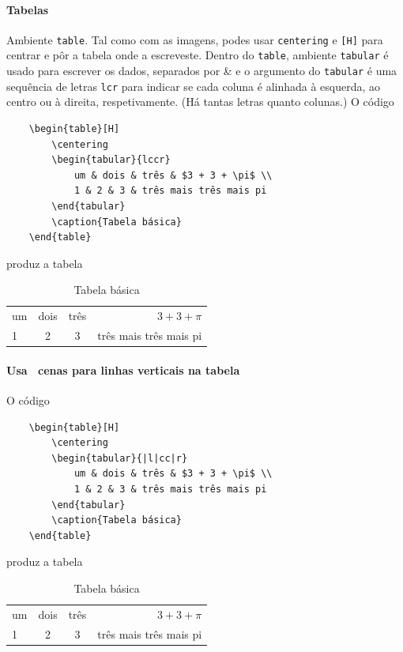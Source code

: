 \documentclass[11pt]{article}
\begin{document}
\paragraph{Tabelas}
Ambiente \texttt{table}.
Tal como com as imagens, podes usar \texttt{centering} e
\texttt{[H]} para centrar e pôr a tabela onde a escreveste.
Dentro do \texttt{table}, ambiente \texttt{tabular} é usado para escrever os
dados, separados por \& e o argumento do \texttt{tabular} é uma sequência de letras
\texttt{lcr} para indicar se cada coluna é alinhada à esquerda, ao centro ou à
direita, respetivamente. (Há tantas letras quanto colunas.)
O código
\begin{verbatim}
    \begin{table}[H]
        \centering
        \begin{tabular}{lccr}
            um & dois & três & $3 + 3 + \pi$ \\
            1 & 2 & 3 & três mais três mais pi
        \end{tabular}
        \caption{Tabela básica}
    \end{table}
\end{verbatim}
produz a tabela
\begin{table}[H]
    \centering
    \begin{tabular}{lccr}
        um & dois & três & $3 + 3 + \pi$ \\
        1 & 2 & 3 & três mais três mais pi
    \end{tabular}
    \caption{Tabela básica}
\end{table}

\paragraph{Usa \textbar~cenas para linhas verticais na tabela}
O código
\begin{verbatim}
    \begin{table}[H]
        \centering
        \begin{tabular}{|l|cc|r}
            um & dois & três & $3 + 3 + \pi$ \\
            1 & 2 & 3 & três mais três mais pi
        \end{tabular}
        \caption{Tabela básica}
    \end{table}
\end{verbatim}
produz a tabela
\begin{table}[H]
    \centering
    \begin{tabular}{|l|cc|r}
        um & dois & três & $3 + 3 + \pi$ \\
        1 & 2 & 3 & três mais três mais pi
    \end{tabular}
    \caption{Tabela básica}
\end{table}
\end{document}

